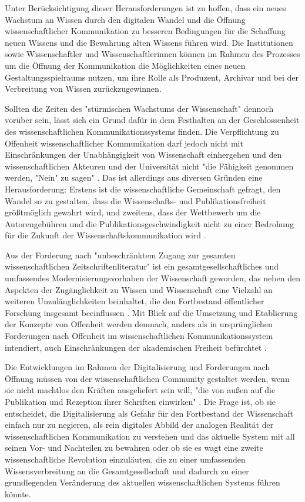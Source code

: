 Unter Berücksichtigung dieser Herausforderungen ist zu hoffen, dass ein neues Wachstum an Wissen durch den digitalen Wandel und die Öffnung wissenschaftlicher Kommunikation zu besseren Bedingungen für die Schaffung neuen Wissens und die Bewahrung alten Wissens führen wird. Die Institutionen sowie Wissenschaftler und Wissenschaftlerinnen können im Rahmen des Prozesses um die Öffnung der Kommunikation die Möglichkeiten eines neuen Gestaltungsspielraums nutzen, um ihre Rolle als Produzent, Archivar und bei der Verbreitung von Wissen zurückzugewinnen.

Sollten die Zeiten des "stürmischen Wachstums der Wissenschaft" \cite{K_lbel_2002} dennoch vorüber sein, lässt sich ein Grund dafür in dem Festhalten an der Geschlossenheit des wissenschaftlichen Kommunikationssystems finden. Die Verpflichtung zu Offenheit wissenschaftlicher Kommunikation darf jedoch nicht mit Einschränkungen der Unabhängigkeit von Wissenschaft einhergehen und den wissenschaftlichen Akteuren und der Universität nicht "die Fähigkeit genommen werden, "Nein" zu sagen" \cite{suchen_Hornbostel_2006}. Das ist allerdings aus diversen Gründen eine Herausforderung: Erstens ist die wissenschaftliche Gemeinschaft gefragt, den Wandel so zu gestalten, dass die Wissenschafts- und Publikationsfreiheit größtmöglich gewahrt wird, und zweitens, dass der Wettbewerb um die Autorengebühren und die Publikationsgeschwindigkeit nicht zu einer Bedrohung für die Zukunft der Wissenschaftskommunikation wird \cite{Beall_2012} \cite{Lossau_oa_2007}.

Aus der Forderung nach "unbeschränktem Zugang zur gesamten wissenschaftlichen Zeitschriftenliteratur" \cite{boai_2012} ist ein gesamtgesellschaftliches und umfassendes Modernisierungsvorhaben der Wissenschaft geworden, das neben den Aspekten der Zugänglichkeit zu Wissen und Wissenschaft eine Vielzahl an weiteren Unzulänglichkeiten beinhaltet, die den Fortbestand öffentlicher Forschung insgesamt beeinflussen \cite{brembs2015open}. Mit Blick auf die Umsetzung und Etablierung der Konzepte von Offenheit werden demnach, anders als in ursprünglichen Forderungen nach Offenheit im wissenschaftlichen Kommunikationssystem intendiert, auch Einschränkungen der akademischen Freiheit befürchtet \cite{hagner_2015_sache_buches}.

Die Entwicklungen im Rahmen der Digitalisierung und Forderungen nach Öffnung müssen von der wissenschaftlichen Community gestaltet werden, wenn sie nicht machtlos den Kräften ausgeliefert sein will, "die von außen auf die Publikation und Rezeption ihrer Schriften einwirken" \cite{Hirschi_2015_buch_oa}. Die Frage ist, ob sie entscheidet, die Digitalisierung als Gefahr für den Fortbestand der Wissenschaft einfach nur zu negieren, als rein digitales Abbild der analogen Realität der wissenschaftlichen Kommunikation zu verstehen und das aktuelle System mit all seinen Vor- und Nachteilen zu bewahren oder ob sie es wagt eine zweite wissenschaftliche Revolution einzuläuten, die zu einer umfassenden Wissensverbreitung an die Gesamtgesellschaft und dadurch zu einer grundlegenden Veränderung des aktuellen wissenschaftlichen Systems führen könnte.

